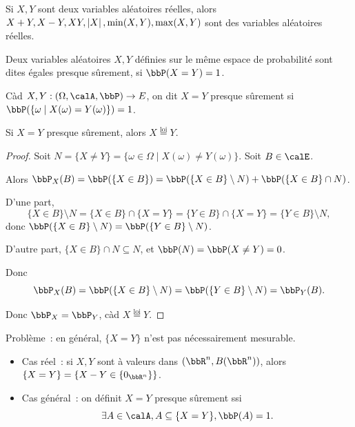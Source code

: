 \begin{rqq}
    Si $X, Y$ sont deux variables aléatoires réelles,
    alors $X + Y, X - Y, XY, \left\lvert X \right\rvert, \min(X, Y), \max(X, Y)$ sont des variables aléatoires réelles.
\end{rqq}

\begin{deff}
    Deux variables aléatoires $X, Y$ définies sur le même espace de probabilité sont dites égales presque sûrement,
    si $\bbP(X = Y) = 1$.
\end{deff}

\begin{rqq}
    Càd $X, Y: (\Omega, \calA, \bbP) \to E$,
    on dit $X = Y$ presque sûrement si $\bbP(\{ \omega \mid X(\omega) = Y(\omega) \}) = 1$.
\end{rqq}

\begin{prop}
    Si $X = Y$ presque sûrement, alors $X \overset{\text{loi}}{=} Y$.
\end{prop}

\begin{proof}
    Soit $N = \{ X \neq Y \} = \{ \omega \in \Omega \mid X(\omega) \neq Y(\omega) \}$.
    Soit $B \in \calE$.

    Alors $\bbP_X(B) = \bbP(\{ X \in B \}) = \bbP(\{ X \in B \} \setminus N) + \bbP(\{ X \in B \} \cap N)$.

    D'une part,
    \[ \{ X \in B \} \setminus N = \{ X \in B \} \cap \{ X = Y \}
        = \{ Y \in B \} \cap \{ X = Y \} = \{ Y \in B \} \setminus N, \]
    donc $\bbP(\{ X \in B \} \setminus N) = \bbP(\{ Y \in B \} \setminus N)$.

    D'autre part, $\{ X \in B \} \cap N \subseteq N$,
    et $\bbP(N) = \bbP(X \neq Y) = 0$.

    Donc
    \[ \bbP_X(B) = \bbP(\{ X \in B \} \setminus N) = \bbP(\{ Y \in B \} \setminus N) = \bbP_Y(B). \]

    Donc $\bbP_X = \bbP_Y$, càd $X \overset{\text{loi}}{=} Y$. \qedhere
\end{proof}

\begin{rqq}
    Problème~: en général, $\{ X = Y \}$ n'est pas nécessairement mesurable.

    \begin{itemize}
        \item Cas réel~: si $X, Y$ sont à valeurs dans $(\bbR^n, B(\bbR^n))$,
              alors $\{ X = Y \} = \{ X - Y \in \{0_{\bbR^n}\} \}$.
        \item Cas général~: on définit $X = Y$ presque sûrement ssi
              \[ \exists A \in \calA, A \subseteq \{ X = Y \}, \bbP(A) = 1. \]
    \end{itemize}
\end{rqq}

